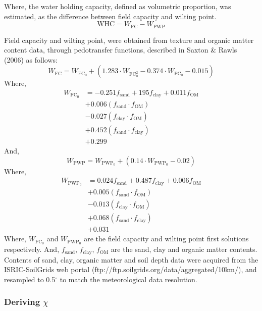 \documentclass{myreport}
\begin{document}
Where, the water holding capacity, defined as volumetric proportion, was estimated, as the difference between field capacity and wilting point.
\begin{equation}
\text{WHC}=W_{\text{FC}}-W_{\text{PWP}}
\end{equation}

Field capacity and wilting point, were obtained from texture and organic matter content data, through pedotransfer functions, described in Saxton \& Rawls (2006) as follows:
\begin{equation}
W_{\text{FC}}= W_{\text{FC}}_{0}+(1.283\cdot W_{\text{FC}}_{0}^{2}-0.374\cdot W_{\text{FC}}_{0}-0.015)
\end{equation}
Where,
\begin{align}
W_{\text{FC}}_{0} &=-0.251f_{\text{sand}}+195f_{\text{clay}}+0.011f_{\text{OM}}\\                            &+0.006(f_{\text{sand}}\cdot f_{\text{OM}})\\
                  &-0.027(f_{\text{clay}}\cdot f_{\text{OM}})\\
                  &+0.452 (f_{\text{sand}}\cdot f_{\text{clay}})\\
                  &+0.299
\end{align}
And,
\begin{equation}
W_{\text{PWP}}=W_{\text{PWP}}_{0}+(0.14\cdot W_{\text{PWP}}_{0}-0.02)
\end{equation}
Where,
\begin{align}
W_{\text{PWP}}_{0} &=0.024 f_{\text{sand}} + 0.487 f_{\text{clay}} + 0.006 f_{\text{OM}} \\
                  &+0.005 ( f_{\text{sand}}\cdot f_{\text{OM}} )\\
                  &-0.013( f_{\text{clay}}\cdot f_{\text{OM}} )\\
                  &+0.068( f_{\text{sand}} \cdot f_{\text{clay}} )\\
                  &+0.031
\end{align}
Where, $W_{\text{FC}}_{0}$ and $W_{\text{PWP}}_{0}$ are the field capacity and wilting point first solutions respectively. And, $f_{\text{sand}}$, $f_{\text{clay}}$, $f_{\text{OM}}$ are the sand, clay and organic matter contents.
Contents of sand, clay, organic matter and soil depth data were acquired from the ISRIC-SoilGrids web portal (ftp://ftp.soilgrids.org/data/aggregated/10km/), and resampled to 0.5$^{\circ}$ to match the meteorological data resolution.


\subsubsection{Deriving $\chi$}
\label{sec:steps_chi}
\end{document}
